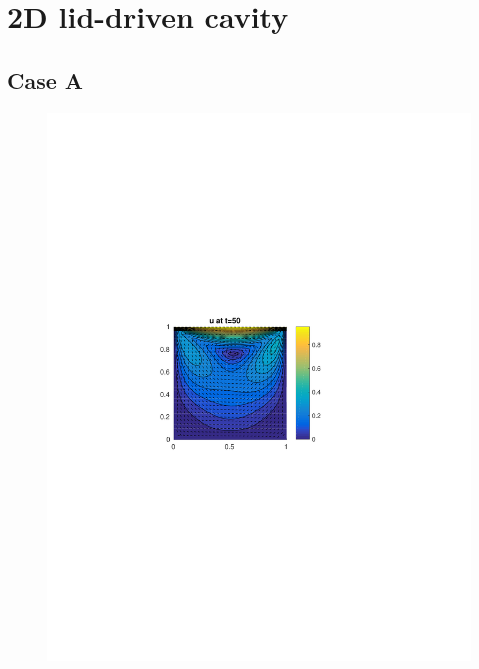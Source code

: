 \documentclass[10pt,a4paper]{article}
\begin{document}
\section{2D lid-driven cavity}

\subsection{Case A}

\begin{figure}
\centering
\begin{minipage}{.5\textwidth}
  \centering
  \includegraphics[width=.9\linewidth]{Part1_Case_A_Velocity.pdf}
\end{minipage}%
\begin{minipage}{.5\textwidth}
  \centering

\end{minipage}
\end{figure}
\end{document}
